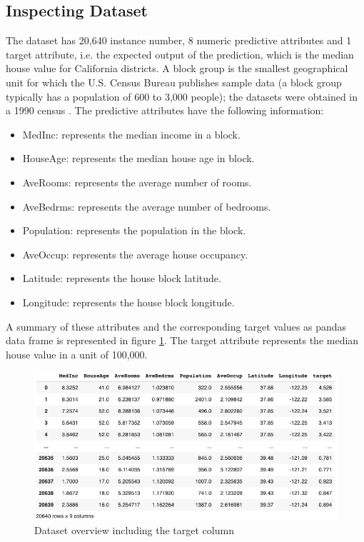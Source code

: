 \documentclass[conference]{IEEEtran}
\begin{document}
\subsection{Inspecting Dataset}
The dataset has 20,640 instance number, 8 numeric predictive attributes and 1 target attribute, i.e. the expected output of the prediction, which is the median house value for California districts. A block group is the smallest geographical unit for which the U.S. Census Bureau publishes sample data (a block group typically has a population of 600 to 3,000 people); the datasets were obtained in a 1990 census \cite{KELLEYPACE1997291}.
The predictive attributes have the following information: 
	\begin{itemize}
		\item MedInc: represents the median income in a block.
		\item HouseAge: represents the median house age in block.
    		\item AveRooms: represents the average number of rooms.
    		\item AveBedrms: represents the average number of bedrooms.
    		\item Population: represents the population in the block.
    		\item AveOccup: represents the average house occupancy.
	    \item Latitude: represents the house block latitude.
    		\item Longitude: represents the house block longitude.
	\end{itemize}
A summary of these attributes and the corresponding target values as pandas data frame is represented in figure \ref{fig:overview_dataset_with_target}. The target attribute represents the median house value in a unit of 100,000.

\begin{figure}[htbp]
	\centerline{\includegraphics [scale=0.32]{figures/overview_dataset_with_target.png}}
	\caption{Dataset overview including the target column}
	\label{fig:overview_dataset_with_target}
\end{figure}
\end{document}

